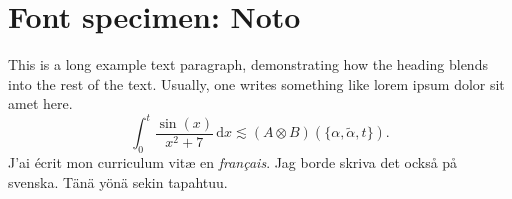 \documentclass[11pt]{report}
\begin{document}
\section*{Font specimen: Noto}
This is a long example text paragraph,
demonstrating how the heading blends into the rest of the text.
Usually, one writes something like lorem ipsum dolor sit amet here.
\[
\int_0^t \frac{\sin(x)}{x^2 + 7} \,\mathrm dx
\lesssim (A \otimes B)(\{ \alpha, \tilde\alpha, t \}).
\]
J'ai écrit mon curriculum vit\ae{} en \emph{fran\c{c}ais}.
Jag borde skriva det också på svenska.
Tänä yönä sekin tapahtuu.
\end{document}
